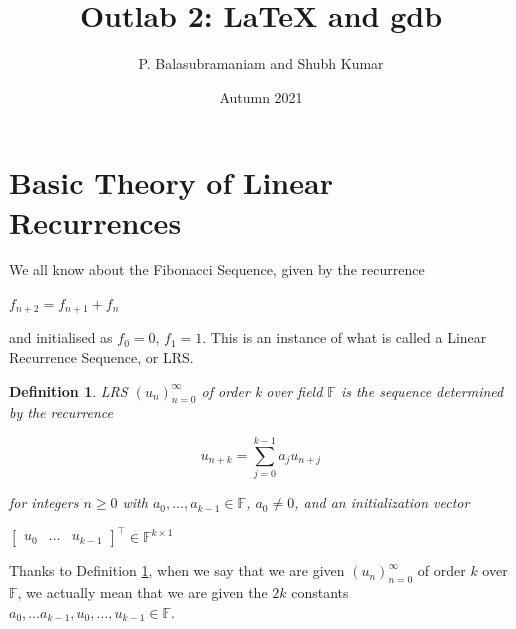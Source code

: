 \documentclass[10.8pt,oneside,reqno]{article}
\newtheorem{definition}{Definition}
\begin{document}
 


\title{Outlab 2: {\LaTeX} and gdb }
\author{P. Balasubramaniam and Shubh Kumar}
\date{Autumn 2021}
\maketitle
{}
\renewcommand{\footrulewidth}{0.8pt}
\tableofcontents
\pagestyle{fancy}
\fancyhf{}

\pagebreak


\section{Basic Theory of Linear Recurrences}

We all know about the Fibonacci Sequence, given by the recurrence 

\begin{center}
    $f_{n+2} = f_{n+1}+f_{n}$ \\ 
\end{center}

and initialised as $f_0 = 0$, $f_1 = 1$. This is an instance of what is called a Linear Recurrence
Sequence, or LRS. 

\begin{definition} 
    \label{def:1}
    LRS $( u_n )_{n=0} ^{\infty}$ of order k over field $\mathbb{F}$  is the sequence determined by the recurrence 
    \begin{center}
         \begin{equation}
            \label{eq:1}
             u_{n+k} =  \sum_{j=0}^{k-1} a_j u_{n+j}
         \end{equation}  
    \end{center}
    for integers $n \geq 0$ with $ a_0, \dots, a_{k-1} \in \mathbb{F}$, $a_0 \neq 0$, and an initialization vector
    \begin{center}
        $\begin{bmatrix}
            u_0 & \dots & u_{k-1}
        \end{bmatrix}^{\intercal} \in \mathbb{F}^{k \times 1}$
    \end{center}
    
    
\end{definition}

Thanks to Definition \hyperref[def:1]{1}, when we say that we are given $( u_n )^{\infty} _{n=0}$ of order $k$ over $\mathbb{F}$, we actually mean that we are given the $2k$ constants $ a_0 , \dots a_{k-1} , u_0 , \dots , u_{k-1} \in \mathbb{F}$. \\ 
\end{document}
